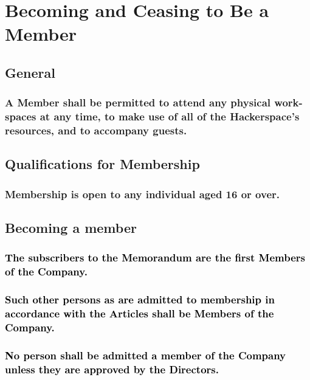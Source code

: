 \documentclass[12pt]{article}
\def\fakecolour{black}
\begin{document}
\section*{Becoming and Ceasing to Be a Member}
  
\subsection{General}
\subsubsection[Members' Access to Resources]{A Member shall be permitted to attend any physical work-spaces at any time, to make use of all of the Hackerspace's resources, and to accompany guests.}

\subsection{Qualifications for Membership}
\subsubsection[Membership 16 and Above]{Membership is open to any individual aged 16 or over.}

\subsection{Becoming a member}
\subsubsection[First Members of the Company]{\textcolor{\fakecolour}{The subscribers to the Memorandum are the first Members of the Company.}}
\subsubsection[Members Are Admitted in Accordance with Articles]{\textcolor{\fakecolour}{Such other persons as are admitted to membership in accordance with the Articles shall be Members of the Company.}}
\subsubsection[Potential Members Must Be Approved by Directors]{\textcolor{\fakecolour}{No person shall be admitted a member of the Company unless they are approved by the Directors.}}
\end{document}
